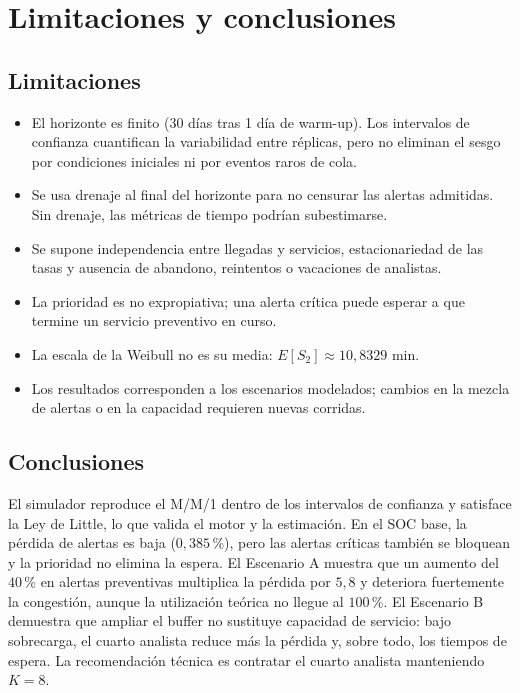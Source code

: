 \section{Limitaciones y conclusiones}

\subsection{Limitaciones}

\begin{itemize}[leftmargin=1.2em,itemsep=0.15em]
  \item El horizonte es finito (30 días tras 1 día de warm-up). Los intervalos
  de confianza cuantifican la variabilidad entre réplicas, pero no eliminan el
  sesgo por condiciones iniciales ni por eventos raros de cola.
  \item Se usa drenaje al final del horizonte para no censurar las alertas
  admitidas. Sin drenaje, las métricas de tiempo podrían subestimarse.
  \item Se supone independencia entre llegadas y servicios, estacionariedad de
  las tasas y ausencia de abandono, reintentos o vacaciones de analistas.
  \item La prioridad es no expropiativa; una alerta crítica puede esperar a que
  termine un servicio preventivo en curso.
  \item La escala de la Weibull no es su media: $E[S_2]\approx10{,}8329$ min.
  \item Los resultados corresponden a los escenarios modelados; cambios en la
  mezcla de alertas o en la capacidad requieren nuevas corridas.
\end{itemize}

\subsection{Conclusiones}

El simulador reproduce el M/M/1 dentro de los intervalos de confianza y
satisface la Ley de Little, lo que valida el motor y la estimación. En el SOC
base, la pérdida de alertas es baja ($0{,}385$\,\%), pero las alertas críticas
también se bloquean y la prioridad no elimina la espera. El Escenario A muestra
que un aumento del $40$\,\% en alertas preventivas multiplica la pérdida por
$5{,}8$ y deteriora fuertemente la congestión, aunque la utilización teórica no
llegue al $100$\,\%. El Escenario B demuestra que ampliar el buffer no sustituye
capacidad de servicio: bajo sobrecarga, el cuarto analista reduce más la
pérdida y, sobre todo, los tiempos de espera. La recomendación técnica es
contratar el cuarto analista manteniendo $K=8$.
